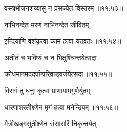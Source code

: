 
{\devanagarifont वस्त्रभोजनशय्यासु न प्रसज्येत विस्तरम् {॥११:५३॥} \veg\dontdisplaylinenum }%

{\devanagarifont नाभिनन्देत मरणं नाभिनन्देत जीवितम् \thinspace{\dandab} \dontdisplaylinenum }%


{\devanagarifont इन्द्रियाणि वशंकृत्वा कामं हत्वा यतव्रतः {॥११:५४॥} \veg\dontdisplaylinenum }%

{\devanagarifont अतीतं च भविष्यं च न भिक्षुश्चिन्तयेत्सदा \thinspace{\dandab} \dontdisplaylinenum }%


{\devanagarifont क्रोधमानमददर्पान्परिव्राड्वर्जयेत्सदा {॥११:५५॥} \veg\dontdisplaylinenum }%

{\devanagarifont विरागं तु धनुः कृत्वा प्राणायामगुणैर्युतम् \thinspace{\dandab} \dontdisplaylinenum }%


{\devanagarifont धारणाशरतीक्ष्णेन मृगं हत्वा मनेन्द्रियम् {॥११:५६॥} \veg\dontdisplaylinenum }%

{\devanagarifont मैत्रीखड्गसुतीक्ष्णेन संसारारिं निकृन्तयेत् \thinspace{\dandab} \dontdisplaylinenum }%


